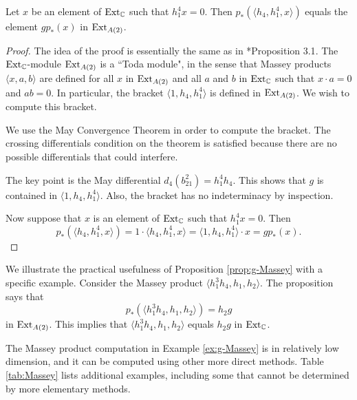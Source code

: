 \begin{prop}
\label{prop:g-Massey}
Let $x$ be an element of $\operatorname{Ext}_{\mathbb{C}}$ such that $h_1^4 x = 0$.
Then $p_* \left( \langle h_4, h_1^4, x \rangle \right)$
equals the element $g p_*(x)$ in $\operatorname{Ext}_{A(2)}$.
\end{prop}

\begin{proof}
The idea of the proof is essentially the same as in
\cite{Isaksen19}*{Proposition 3.1}.
The $\operatorname{Ext}_{\mathbb{C}}$-module $\operatorname{Ext}_{A(2)}$ is a ``Toda module", 
in the sense that Massey products
$\langle x, a, b \rangle$ are defined for all
$x$ in $\operatorname{Ext}_{A(2)}$ and all $a$ and $b$ in $\operatorname{Ext}_{\mathbb{C}}$ such
that $x \cdot a = 0$ and $ab = 0$.
In particular, the bracket $\langle 1, h_4, h_1^4 \rangle$
is defined in $\operatorname{Ext}_{A(2)}$.
We wish to compute this bracket.

We use the May Convergence Theorem in order to compute the
bracket.  The crossing differentials condition on the theorem
is satisfied because there are no possible differentials that 
could interfere.

The key point is the May differential
$d_4(b_{21}^2) = h_1^4 h_4$.  
This shows that $g$ is contained in $\langle 1, h_4, h_1^4 \rangle$.
Also, the bracket has no indeterminacy by inspection.

Now suppose that $x$ 
is an element of $\operatorname{Ext}_{\mathbb{C}}$ such that $h_1^4 x = 0$.
Then
\[
p_* \left( \langle h_4, h_1^4, x \rangle \right) =
1 \cdot \langle h_4, h_1^4, x \rangle =
\langle 1, h_4, h_1^4 \rangle \cdot x =
g p_*(x).
\]
\end{proof}

\begin{ex}
\label{ex:g-Massey}
We illustrate the practical usefulness of
Proposition \ref{prop:g-Massey} with a specific
example.  Consider the Massey product
$\langle h_1^3 h_4, h_1, h_2 \rangle$.
The proposition says that
\[
p_* \left( \langle h_1^3 h_4, h_1, h_2 \rangle \right) = h_2 g
\]
in $\operatorname{Ext}_{A(2)}$.  This implies that
$\langle h_1^3 h_4, h_1, h_2 \rangle$ equals $h_2 g$ in
$\operatorname{Ext}_{\mathbb{C}}$.
\end{ex}

\begin{remark}
The Massey product computation in Example \ref{ex:g-Massey}
is in relatively low dimension, and it can be computed using
other more direct methods.
Table \ref{tab:Massey} lists additional examples, including
some that cannot be determined by more elementary methods.
\end{remark}

